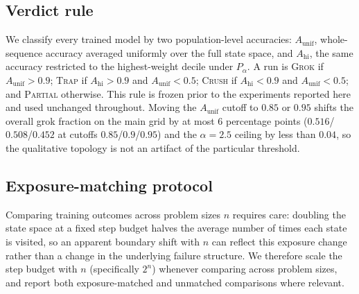 \documentclass[11pt]{article}
\begin{document}
\subsection{Verdict rule}
We classify every trained model by two population-level accuracies: $A_{\mathrm{unif}}$, whole-sequence accuracy averaged uniformly over the full state space, and $A_{\mathrm{hi}}$, the same accuracy restricted to the highest-weight decile under $P_\alpha$. A run is \textsc{Grok} if $A_{\mathrm{unif}}>0.9$; \textsc{Trap} if $A_{\mathrm{hi}}>0.9$ and $A_{\mathrm{unif}}<0.5$; \textsc{Crush} if $A_{\mathrm{hi}}<0.9$ and $A_{\mathrm{unif}}<0.5$; and \textsc{Partial} otherwise. This rule is frozen prior to the experiments reported here and used unchanged throughout. Moving the $A_{\mathrm{unif}}$ cutoff to $0.85$ or $0.95$ shifts the overall grok fraction on the main grid by at most $6$ percentage points ($0.516$/$0.508$/$0.452$ at cutoffs $0.85$/$0.9$/$0.95$) and the $\alpha=2.5$ ceiling by less than $0.04$, so the qualitative topology is not an artifact of the particular threshold.

\subsection{Exposure-matching protocol}
Comparing training outcomes across problem sizes $n$ requires care: doubling the state space at a fixed step budget halves the average number of times each state is visited, so an apparent boundary shift with $n$ can reflect this exposure change rather than a change in the underlying failure structure. We therefore scale the step budget with $n$ (specifically $2^n$) whenever comparing across problem sizes, and report both exposure-matched and unmatched comparisons where relevant.
\end{document}
